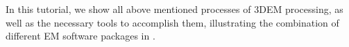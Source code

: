  In this tutorial, we show all above mentioned processes of 3DEM processing, as well as the necessary tools to accomplish them, illustrating the combination of different EM software packages in \scipion.
 
 

  

